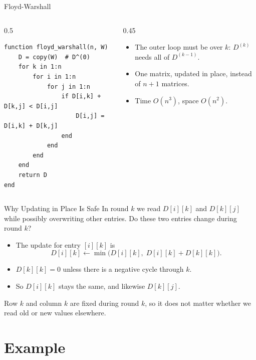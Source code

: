 \documentclass[10pt,aspectratio=169,xcolor=table]{beamer}
\begin{document}
\begin{frame}[fragile]{Floyd-Warshall}
  \begin{columns}[c]
    \begin{column}{0.5\textwidth}
\begin{lstlisting}
function floyd_warshall(n, W)
    D = copy(W)  # D^(0)
    for k in 1:n
        for i in 1:n
            for j in 1:n
                if D[i,k] + D[k,j] < D[i,j]
                    D[i,j] = D[i,k] + D[k,j]
                end
            end
        end
    end
    return D
end
\end{lstlisting}
    \end{column}
    \begin{column}{0.45\textwidth}
      \begin{itemize}
        \item The outer loop must be over $k$: $D^{(k)}$ needs all of
              $D^{(k-1)}$.
        \item One matrix, updated \alert{in place}, instead of $n + 1$
              matrices.
        \item Time $O(n^3)$, space $O(n^2)$.
      \end{itemize}
    \end{column}
  \end{columns}
\end{frame}

\begin{frame}{Why Updating in Place Is Safe}
  In round $k$ we read $D[i][k]$ and $D[k][j]$ while possibly overwriting
  other entries. Do these two entries change during round $k$?

  \pause
  \bigskip
  \begin{itemize}
    \item The update for entry $[i][k]$ is
          \[
            D[i][k] \gets \min\bigl(D[i][k],\; D[i][k] + D[k][k]\bigr).
          \]
    \item $D[k][k] = 0$ unless there is a negative cycle through $k$.
    \item So $D[i][k]$ stays the same, and likewise $D[k][j]$.
  \end{itemize}

  \bigskip
  Row $k$ and column $k$ are fixed during round $k$, so it does not matter
  whether we read old or new values elsewhere.
\end{frame}

\section{Example}
\end{document}
